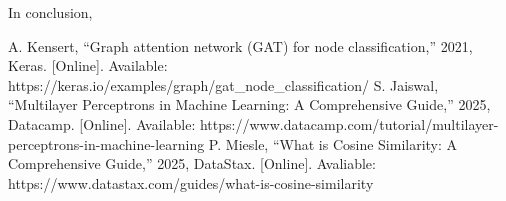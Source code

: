 \documentclass[conference]{IEEEtran}
\begin{document}
In conclusion, 

\begin{thebibliography}{00}
 A. Kensert, “Graph attention network (GAT) for node
    classification,” 2021, Keras. [Online]. Available:
    https://keras.io/examples/graph/gat\_node\_classification/
 S. Jaiswal, “Multilayer Perceptrons in Machine Learning: A
    Comprehensive Guide,” 2025, Datacamp. [Online]. Available:
    https://www.datacamp.com/tutorial/multilayer-perceptrons-in-machine-learning
 P. Miesle, “What is Cosine Similarity: A Comprehensive
    Guide,” 2025, DataStax. [Online]. Avaliable:
    https://www.datastax.com/guides/what-is-cosine-similarity
\end{thebibliography}
\end{document}
